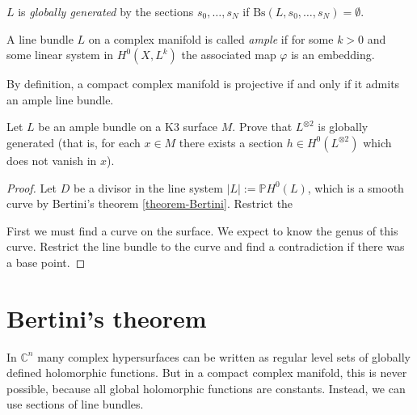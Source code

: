 \begin{definition}
\label{definition-globally-generated}
\begin{reference}
\cite[p. 86]{huc}
\end{reference}
$L$ is {\it globally generated} by the sections $s_0,\ldots,s_N$ if
$\text{Bs}(L,s_0,\ldots,s_N)=\emptyset$.
\end{definition}

\begin{definition}
\label{definition-ample}
\begin{reference}
\cite[Definition 2.3.28]{huc}
\end{reference}
A line bundle $L$ on a complex manifold is called {\it ample} if for some $k>0$
and some linear system in $H^{0}(X,L^k)$ the associated map $\varphi$ is an
embedding.
\end{definition}

\begin{slogan}
By definition, a compact complex manifold is projective if and only if it admits
an ample line bundle.
\end{slogan}

\begin{exercise}
\label{exercise-L-ample-implies-Lotimes2-globally-generated}
Let $L$ be an ample bundle on a K3 surface $M$. Prove that $L^{\otimes 2}$ is
globally generated (that is, for each $x \in M$ there exists a section $h \in
H^{0}(L^{\otimes 2})$ which does not vanish in $x$).
\end{exercise}

\begin{proof}
Let $D$ be a divisor in the line system $|L|:=\mathbb{P}H^{0}(L)$, which is a
smooth curve by Bertini's theorem \ref{theorem-Bertini}. Restrict the


First we must find a curve on the surface. We expect to know the genus of this
curve. Restrict the line bundle to the curve and find a contradiction if there
was a base point.
\end{proof}

\section{Bertini's theorem}
\label{section-Bertini-theorem}

\begin{slogan}
In \(\mathbb{C}^n\) many complex hypersurfaces can be written as regular level
sets of globally defined holomorphic functions. But in a compact complex
manifold, this is never possible, because all global holomorphic functions are
constants. Instead, we can use sections of line bundles.
\end{slogan}

